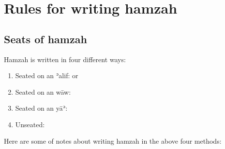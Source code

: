 \documentclass[
  10pt,
]{book}
\providecommand{\tightlist}{%
  \setlength{\itemsep}{0pt}\setlength{\parskip}{0pt}}
\begin{document}
\appendix


\chapter{Rules for writing hamzah}\label{hamzarules}

\section{Seats of hamzah}\label{seats-of-hamzah}

Hamzah is written in four different ways:

\begin{enumerate}
\def\labelenumi{\arabic{enumi}.}
\tightlist
\item
  Seated on an ʾalif: {} or {}
\item
  Seated on an wāw: {}
\item
  Seated on an yāʾ: {}
\item
  Unseated: {}
\end{enumerate}

Here are some of notes about writing hamzah in the above four methods:
\end{document}
